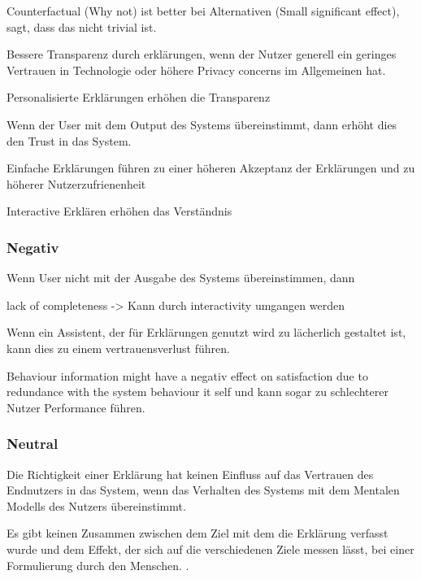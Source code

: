 Counterfactual (Why not) ist better bei Alternativen \cite{martin_evaluating_2021}  \cite{neerincx_using_2018} \cite{schrills_color_2020} (Small significant effect), \cite{lim_2009_assessing} sagt, dass das nicht trivial ist.

Bessere Transparenz durch erklärungen, wenn der Nutzer generell ein geringes Vertrauen in Technologie oder höhere Privacy concerns im Allgemeinen hat. \cite{tsai_effects_2020}

Personalisierte Erklärungen erhöhen die Transparenz \cite{sokol_one_2020, wiegand2019drive}

Wenn der User mit dem Output des Systems übereinstimmt, dann erhöht dies den Trust in das System. \cite{schrills_color_2020}

Einfache Erklärungen führen zu einer höheren Akzeptanz der Erklärungen und zu höherer Nutzerzufrienenheit \cite{hleg2019policy, sovrano_modelling_2020}

Interactive Erklären erhöhen das Verständnis \cite{cheng2019explaining}

\subsubsection*{Negativ}

Wenn User nicht mit der Ausgabe des Systems übereinstimmen, dann 

lack of completeness \cite{chazette_end-users_nodate} -> Kann durch interactivity umgangen werden

Wenn ein Assistent, der für Erklärungen genutzt wird zu lächerlich gestaltet ist, kann dies zu einem vertrauensverlust führen. \cite{wang_is_2018}

Behaviour information might have a negativ effect on satisfaction due to redundance with the system behaviour it self und kann sogar zu schlechterer Nutzer Performance führen. \cite{koo_why_2015}

\subsubsection*{Neutral}

Die Richtigkeit einer Erklärung hat keinen Einfluss auf das Vertrauen des Endnutzers in das System, wenn das Verhalten des Systems mit dem Mentalen Modells des Nutzers übereinstimmt. \cite{eiband_impact_2019, riveiro_thats_2021}

Es gibt keinen Zusammen zwischen dem Ziel mit dem die Erklärung verfasst wurde und dem Effekt, der sich auf die verschiedenen Ziele messen lässt, bei einer Formulierung durch den Menschen. \cite{balog_measuring_2020}.

